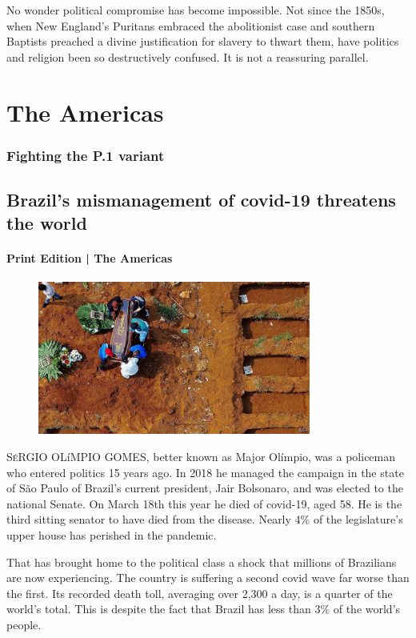 \documentclass{article}
\begin{document}
No wonder political compromise has become impossible. Not since the 1850s, when New England's Puritans embraced the abolitionist case and southern Baptists preached a divine justification for slavery to thwart them, have politics and religion been so destructively confused. It is not a reassuring parallel. {} 
\clearpage
\section{The Americas }
\subsubsection{Fighting the P.1 variant }
\subsection{Brazil's mismanagement of covid-19 threatens the world }
\paragraph{Print Edition | The Americas  \quad \color{gray}{Mar 27th 2021 }}
\begin{figure}[h]
\centering
\includegraphics[width=0.8\textwidth]{images/20210327_AMP001_0.jpg}
\end{figure}
\lettrine{S}éRGIO OLíMPIO GOMES, better known as Major Olímpio, was a policeman who entered politics 15 years ago. In 2018 he managed the campaign in the state of São Paulo of Brazil's current president, Jair Bolsonaro, and was elected to the national Senate. On March 18th this year he died of covid-19, aged 58. He is the third sitting senator to have died from the disease. Nearly 4\% of the legislature's upper house has perished in the pandemic. 

That has brought home to the political class a shock that millions of Brazilians are now experiencing. The country is suffering a second covid wave far worse than the first. Its recorded death toll, averaging over 2,300 a day, is a quarter of the world's total. This is despite the fact that Brazil has less than 3\% of the world's people. 
\end{document}
